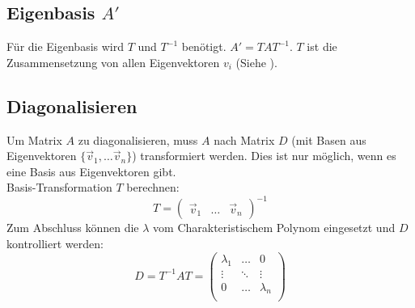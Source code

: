 \subsection{Eigenbasis $A'$}\label{eigenbasis}
Für die Eigenbasis wird $T$ und $T^{-1}$ benötigt. $A' = TAT^{-1}$. $T$ ist die Zusammensetzung von allen Eigenvektoren $v_i$ (Siehe ).

\subsection{Diagonalisieren}\label{diagonalisieren}
Um Matrix $A$ zu diagonalisieren, muss $A$ nach Matrix $D$ (mit Basen aus Eigenvektoren $\{\vec{v}_1,\dots\vec{v}_n\}$) transformiert werden. Dies ist nur möglich, wenn es eine Basis aus Eigenvektoren gibt. \\
Basis-Transformation $T$ berechnen:
\[T = \begin{pmatrix}
	\vec{v}_1 & \dots & \vec{v}_n
\end{pmatrix}^{-1}\]
Zum Abschluss können die $\lambda$ vom Charakteristischem Polynom eingesetzt und $D$ kontrolliert werden:
\[D = T^{-1}AT = \begin{pmatrix}
	\lambda_1 & \dots & 0 \\
	\vdots & \ddots & \vdots \\
	0 & \dots & \lambda_n \\
\end{pmatrix}\]
